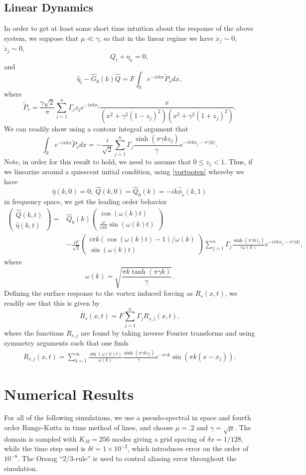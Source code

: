 \documentclass[a4paper,11pt]{article}
\newcommand{\bp}{\begin{pmatrix}}
\newcommand{\ep}{\end{pmatrix}}
\begin{document}
\subsection{Linear Dynamics}
In order to get at least some short time intuition about the response of the above system, we suppose that $\mu \ll \gamma$, so that in the linear regime we have $\dot{x}_{j}\sim 0$, $\dot{z}_{j}\sim 0$, 
\[
Q_{t} + \eta_{x} = 0,
\]
and
\[
\hat{\eta}_{t} -\hat{G}_{0}(k)\hat{Q} = F\int_{\mathbb{R}}e^{-i \pi kx} \tilde{P}_{v}dx,
\]
where
\[
\tilde{P}_{v} = \frac{\gamma\sqrt{2}}{\pi}\sum_{j=1}^{n}\Gamma_{j}z_{j}e^{-i\pi kx_{j}} \frac{x}{(x^{2}+\gamma^{2}(1-z_{j})^{2})(x^{2}+\gamma^{2}(1+z_{j})^{2})} .
\]
We can readily show using a contour integral argument that 
\[
\int_{\mathbb{R}}e^{-i\pi kx} \tilde{P}_{v}dx = -\frac{i}{\sqrt{2}}\sum_{j=1}^{n}\Gamma_{j} \frac{\sinh(\pi \gamma k z_{j})}{\gamma} e^{-i\pi kx_{j}-\pi \gamma |k|}. 
\]
Note, in order for this result to hold, we need to assume that $0\leq z_{j} <1$.  Thus, if we linearize around a quiescent initial condition, using \eqref{vortpoten} whereby we have
\[
\hat{\eta}(k,0)=0, ~ \hat{Q}(k,0)=\hat{Q}_{0}(k) = -ik\hat{\phi}_{v}(k,1)
\]
in frequency space, we get the leading order behavior
\begin{align*}
\bp \hat{Q}(k,t) \\ \hat{\eta}(k,t) \ep = & \hat{Q}_{0}(k)\bp \cos(\omega(k)t)\\\frac{ \omega}{i\pi k} \sin(\omega(k)t)\ep \\
&-\frac{iF}{\sqrt{2}}\bp i\pi k(\cos(\omega(k)t)-1)/\omega(k) \\   \sin(\omega(k)t) \ep \sum_{j=1}^{n}\Gamma_{j}\frac{\sinh(\pi \gamma k z_{j})}{\gamma \omega(k)}e^{-i\pi kx_{j}-\pi \gamma |k|},
\end{align*}
where 
\[
\omega(k) = \sqrt{\frac{ \pi k \tanh(\pi \gamma k)}{ \gamma }}.  
\]
Defining the surface response to the vortex induced forcing as $R_{s}(x,t)$, we readily see that this is given by 
\[
R_{s}(x,t) = F\sum_{j=1}^{n}\Gamma_{j}R_{s,j}(x,t).
\]
where the functions $R_{s,j}$ are found by taking inverse Fourier transforms and using symmetry arguments such that one finds  
\begin{align*}
R_{s,j}(x,t) = \sum_{k=1}^{\infty} \frac{\sin(\omega(k)t)}{\omega(k)}\frac{\sinh(\pi \gamma k z_{j})}{\gamma}e^{-\pi \gamma k}\sin(\pi k (x-x_{j})).
\end{align*}
\section{Numerical Results}
For all of the following simulations, we use a pseudo-spectral in space and fourth order Runge-Kutta in time method of lines, and choose $\mu=.2$ and $\gamma = \sqrt{\mu}$. 
The domain is sampled with $K_{M} = 256$ modes giving a grid spacing of $\delta x = 1/128$, while the time step used is $\delta t = 1\times 10^{-2}$, which introduces error on the order of $10^{-8}$.  The Orszag ``2/3-rule'' is used to control aliasing error throughout the simulation.      
\end{document}
